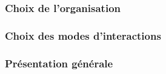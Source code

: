 		\subsubsection{Choix de l'organisation}
		\subsubsection{Choix des modes d'interactions}
		\subsubsection{Présentation générale}

